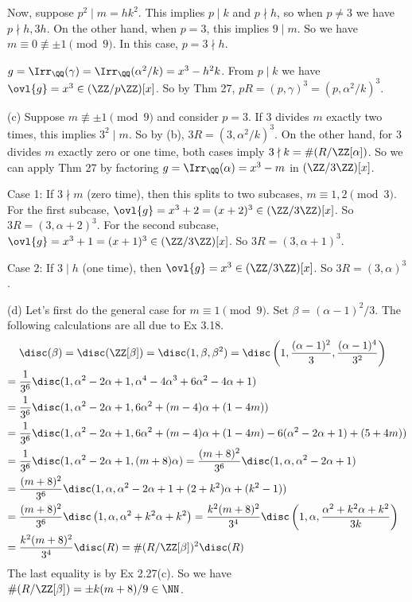 \documentclass[../Chapter.tex]{subfiles}
\begin{document}
Now, suppose $p^2\mid m=hk^2$. This implies $p\mid k$ and $p\nmid h$, so when $p\neq 3$ we have $p\nmid h,3h$. On the other hand, when $p=3$, this implies $9\mid m$. So we have $m\equiv 0\not\equiv \pm 1\pmod{9}$. In this case, $p=3\nmid h$.

$g=\Irr_\QQ(\gamma)=\Irr_\QQ(\alpha^2/k)=x^3-h^2k$. From $p\mid k$ we have $\ovl{g}=x^3\in(\ZZ/p\ZZ)[x]$. So by Thm 27, $pR=(p,\gamma)^3=(p,\alpha^2/k)^3$.

(c) Suppose $m\not\equiv \pm1\pmod{9}$ and consider $p=3$. If $3$ divides $m$ exactly two times, this implies $3^2\mid m$. So by (b), $3R=(3,\alpha^2/k)^3$. On the other hand, for $3$ divides $m$ exactly zero or one time, both cases imply $3\nmid k=\#(R/\ZZ[\alpha])$. So we can apply Thm 27 by factoring $g=\Irr_\QQ(\alpha)=x^3-m$ in $(\ZZ/3\ZZ)[x]$.

Case 1: If $3\nmid m$ (zero time), then this splits to two subcases, $m\equiv 1,2\pmod{3}$. For the first subcase, $\ovl{g}=x^3+2=(x+2)^3\in(\ZZ/3\ZZ)[x]$. So $3R=(3,\alpha+2)^3$. For the second subcase, $\ovl{g}=x^3+1=(x+1)^3\in(\ZZ/3\ZZ)[x]$. So $3R=(3,\alpha+1)^3$.

Case 2: If $3\mid h$ (one time), then $\ovl{g}=x^3\in(\ZZ/3\ZZ)[x]$. So $3R=(3,\alpha)^3$.

(d) Let's first do the general case for $m\equiv 1 \pmod{9}$. Set $\beta=(\alpha-1)^2/3$. The following calculations are all due to Ex 3.18.
\begin{align*}
&\disc(\beta) = \disc(\ZZ[\beta]) = \disc(1,\beta,\beta^2) = \disc\left(1,\frac{(\alpha-1)^2}{3},\frac{(\alpha-1)^4}{3^2}\right) \\ ={} &\frac{1}{3^6}\disc(1,\alpha^2-2\alpha+1,\alpha^4-4\alpha^3+6\alpha^2-4\alpha+1) \\ ={} &\frac{1}{3^6}\disc(1,\alpha^2-2\alpha+1,6\alpha^2+(m-4)\alpha+(1-4m)) \\ ={} &\frac{1}{3^6}\disc(1,\alpha^2-2\alpha+1,6\alpha^2+(m-4)\alpha+(1-4m)-6(\alpha^2-2\alpha+1)+(5+4m)) \\ ={} &\frac{1}{3^6}\disc(1,\alpha^2-2\alpha+1,(m+8)\alpha) = \frac{(m+8)^2}{3^6}\disc(1,\alpha,\alpha^2-2\alpha+1) \\ ={} &\frac{(m+8)^2}{3^6}\disc(1,\alpha,\alpha^2-2\alpha+1+(2+k^2)\alpha+(k^2-1)) \\ ={} &\frac{(m+8)^2}{3^6}\disc\left(1,\alpha,\alpha^2+k^2\alpha+k^2\right) = \frac{k^2(m+8)^2}{3^4}\disc\left(1,\alpha,\frac{\alpha^2+k^2\alpha+k^2}{3k}\right) \\ ={} &\frac{k^2(m+8)^2}{3^4}\disc(R) = \#(R/\ZZ[\beta])^2\disc(R)
\end{align*}
The last equality is by Ex 2.27(c). So we have $\#(R/\ZZ[\beta])=\pm k(m+8)/9\in\NN$.
\end{document}

